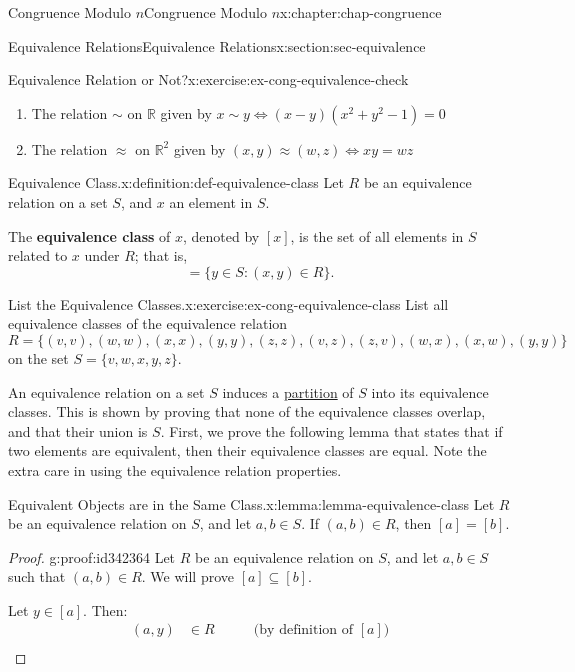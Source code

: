 \documentclass[oneside,10pt,]{book}
\newcommand{\terminology}[1]{\textbf{#1}}
\numberwithin{equation}{section}
\newcommand{\amp}{&}
\begin{document}
\begin{chapterptx}{Congruence Modulo \(n\)}{}{Congruence Modulo \(n\)}{}{}{x:chapter:chap-congruence}
\begin{sectionptx}{Equivalence Relations}{}{Equivalence Relations}{}{}{x:section:sec-equivalence}
\begin{inlineexercise}{Equivalence Relation or Not?}{x:exercise:ex-cong-equivalence-check}
\begin{enumerate}[label=(\alph*)]
\item{}The relation \(\sim\) on \(\mathbb{R}\) given by \(x \sim y \Leftrightarrow (x-y)(x^2+y^2-1) = 0\)%
\item{}The relation \(\approx\) on \(\mathbb{R}^2\) given by \((x,y) \approx (w,z) \Leftrightarrow xy = wz\)%
\end{enumerate}
%
\end{inlineexercise}
\begin{definition}{Equivalence Class.}{x:definition:def-equivalence-class}%
\label{g:notation:id442999}%
Let \(R\) be an equivalence relation on a set \(S\), and \(x\) an element in \(S\).%
\par
The \terminology{equivalence class} of \(x\), denoted by \([x]\), is the set of all elements in \(S\) related to \(x\) under \(R\); that is,%
\begin{equation*}
[x] = \{y \in S : (x,y) \in R\}\text{.}
\end{equation*}
%
\end{definition}
\begin{inlineexercise}{List the Equivalence Classes.}{x:exercise:ex-cong-equivalence-class}%
List all equivalence classes of the equivalence relation%
\begin{equation*}
R = \{(v,v),(w,w),(x,x),(y,y),(z,z),(v,z),(z,v),(w,x),(x,w),(y,y)\}
\end{equation*}
on the set \(S = \{v,w,x,y,z\}\).%
\end{inlineexercise}
An equivalence relation on a set \(S\) induces a \hyperref[x:definition:def-partition]{partition} of \(S\) into its equivalence classes. This is shown by proving that none of the equivalence classes overlap, and that their union is \(S\). First, we prove the following lemma that states that if two elements are equivalent, then their equivalence classes are equal. Note the extra care in using the equivalence relation properties.%
\begin{lemma}{Equivalent Objects are in the Same Class.}{}{x:lemma:lemma-equivalence-class}%
Let \(R\) be an equivalence relation on \(S\), and let \(a, b \in S\). If \((a,b) \in R\), then \([a] = [b]\).%
\end{lemma}
\begin{proof}{}{g:proof:id342364}
Let \(R\) be an equivalence relation on \(S\), and let \(a, b \in S\) such that \((a,b) \in R\). We will prove \([a] \subseteq [b]\).%
\par
Let \(y \in [a]\). Then:%
\begin{align*}
(a,y) \amp \in R \qquad \amp \text{(by definition of $[a]$)}\\

\end{align*}
\end{proof}
\end{sectionptx}
\end{chapterptx}
\end{document}
